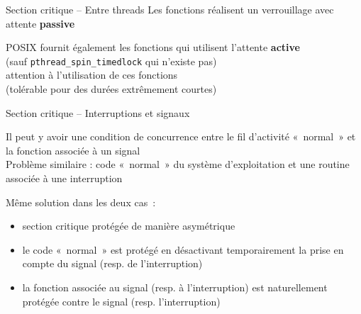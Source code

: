 \begin {frame} {Section critique -- Entre threads}
    Les fonctions  réalisent un verrouillage
    avec attente \textbf {passive}

    \vspace* {3mm}

    POSIX fournit également les fonctions  
    qui utilisent l'attente \textbf {active}
    \\
    (sauf \texttt {\small pthread\_spin\_timedlock} qui n'existe pas)
    \\
    \implique attention à l'utilisation de ces fonctions \\
    (tolérable pour des durées extrêmement courtes)

\end {frame}

\begin {frame} {Section critique -- Interruptions et signaux}

    Il peut y avoir une condition de concurrence entre le fil d'activité
    «~normal~» et la fonction associée à un signal
    \\
    Problème similaire : code «~normal~» du système d'exploitation et une
    routine associée à une interruption

    \vspace* {3mm}

    Même solution dans les deux cas~:

    \begin {itemize}
	\item section critique protégée de manière asymétrique

	\item le code «~normal~» est protégé en désactivant
	    temporairement la prise en compte du signal (resp. de
	    l'interruption)

	\item la fonction associée au signal (resp. à l'interruption)
	    est naturellement protégée contre le signal
	    (resp. l'interruption)

    \end {itemize}

\end {frame}

